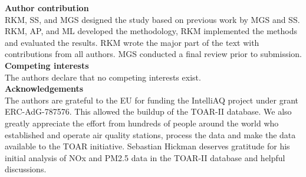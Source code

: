 \documentclass[gmd, manuscript]{copernicus}
\begin{document}



\vspace{0.5cm}

\textbf{Author contribution}\\ RKM, SS, and MGS designed the study based on previous work by MGS and SS. RKM, AP, and ML developed the methodology, RKM implemented the methods and evaluated the results. RKM wrote the major part of the text with contributions from all authors. MGS conducted a final review prior to submission.\vspace{0.5cm}\\%

\textbf{Competing interests}\\The authors declare that no competing interests exist.\\ %

\textbf{Acknowledgements}\\
The authors are grateful to the EU for funding the IntelliAQ project under grant ERC-AdG-787576. This allowed the buildup of the TOAR-II database. We also greatly appreciate the effort from hundreds of people around the world who established and operate air quality stations, process the data and make the data available to the TOAR initiative. Sebastian Hickman deserves gratitude for his initial analysis of NOx and PM2.5 data in the TOAR-II database and helpful discussions.

\end{document}

